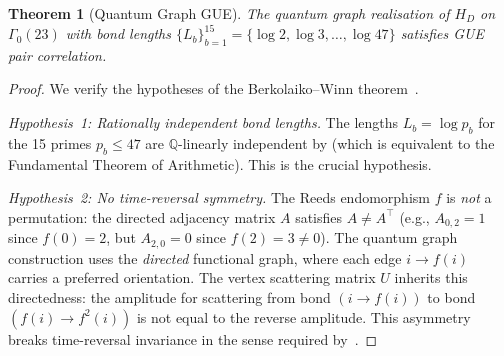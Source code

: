 \documentclass[11pt,a4paper]{article}
\theoremstyle{plain}
\newtheorem{theorem}{Theorem}[section]
\theoremstyle{remark}
\newcommand{\Q}{\mathbb{Q}}
\begin{document}
\begin{theorem}[Quantum Graph GUE]\label{thm:quantum-graph-gue}
The quantum graph realisation of $H_D$ on $\Gamma_0(23)$ with bond
lengths $\{L_b\}_{b=1}^{15}=\{\log 2,\log 3,\ldots,\log 47\}$ satisfies
GUE pair correlation.
\end{theorem}

\begin{proof}
We verify the hypotheses of the Berkolaiko--Winn
theorem~\cite{berkolaiko-winn2010}.

\emph{Hypothesis~1: Rationally independent bond lengths.}
The lengths $L_b=\log p_b$ for the 15 primes $p_b\leq 47$ are
$\Q$-linearly independent by  (which
is equivalent to the Fundamental Theorem of Arithmetic).  This is the
crucial hypothesis.

%
%

\emph{Hypothesis~2: No time-reversal symmetry.}
The Reeds endomorphism $f$ is \emph{not} a permutation: the directed
adjacency matrix $A$ satisfies $A\neq A^\top$ (e.g., $A_{0,2}=1$ since
$f(0)=2$, but $A_{2,0}=0$ since $f(2)=3\neq 0$).  The quantum graph
construction uses the \emph{directed} functional graph, where each edge
$i\to f(i)$ carries a preferred orientation.  The vertex scattering
matrix $U$ inherits this directedness: the amplitude for scattering
from bond $(i\to f(i))$ to bond $(f(i)\to f^2(i))$ is not equal to
the reverse amplitude.  This asymmetry breaks time-reversal invariance
in the sense required by~\cite{berkolaiko-winn2010}.


\end{proof}
\end{document}
